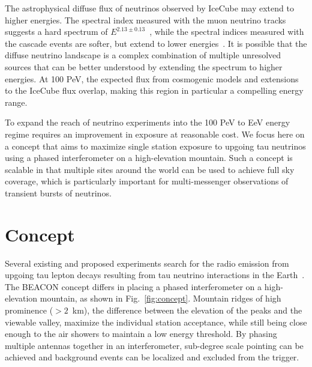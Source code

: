 \documentclass{PoS}
\begin{document}
The astrophysical diffuse flux of neutrinos observed by IceCube may extend to higher energies. The spectral index measured with the muon neutrino tracks suggests a hard spectrum of $E^{2.13\pm0.13}$~\cite{IceCube_muon}, while the spectral indices measured with the cascade events are softer, but extend to lower energies~\cite{HESE, combined}. It is possible that the diffuse neutrino landscape is a complex combination of multiple unresolved sources that can be better understood by extending the spectrum to higher energies. At 100 PeV, the expected flux from cosmogenic models and extensions to the IceCube flux overlap, making this region in particular a compelling energy range. 

To expand the reach of neutrino experiments into the 100 PeV to EeV energy regime requires an improvement in exposure at reasonable cost. We focus here on a concept that aims to maximize single station exposure to upgoing tau neutrinos using a phased interferometer on a high-elevation mountain. Such a concept is scalable in that multiple sites around the world can be used to achieve full sky coverage, which is particularly important for multi-messenger observations of transient bursts of neutrinos.

\section{Concept}
Several existing and proposed experiments search for the radio emission from upgoing tau lepton decays resulting from tau neutrino interactions in the Earth~\cite{Auger, GRAND, Trinity, POEMMA}. The BEACON concept differs in placing a phased interferometer on a high-elevation mountain, as shown in Fig.~\ref{fig:concept}. Mountain ridges of high prominence ($>2$~km), the difference between the elevation of the peaks and the viewable valley, maximize the individual station acceptance, while still being close enough to the air showers to maintain a low energy threshold. By phasing multiple antennas together in an interferometer, sub-degree scale pointing can be achieved and background events can be localized and excluded from the trigger.
\end{document}
